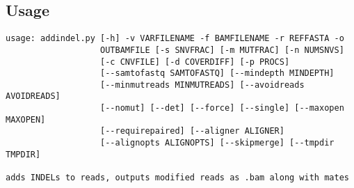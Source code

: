 \documentclass[letterpaper,11pt]{article}
\begin{document}
\subsection{Usage}
\begin{verbatim}
usage: addindel.py [-h] -v VARFILENAME -f BAMFILENAME -r REFFASTA -o
                   OUTBAMFILE [-s SNVFRAC] [-m MUTFRAC] [-n NUMSNVS]
                   [-c CNVFILE] [-d COVERDIFF] [-p PROCS]
                   [--samtofastq SAMTOFASTQ] [--mindepth MINDEPTH]
                   [--minmutreads MINMUTREADS] [--avoidreads AVOIDREADS]
                   [--nomut] [--det] [--force] [--single] [--maxopen MAXOPEN]
                   [--requirepaired] [--aligner ALIGNER]
                   [--alignopts ALIGNOPTS] [--skipmerge] [--tmpdir TMPDIR]

adds INDELs to reads, outputs modified reads as .bam along with mates


\end{verbatim}
\end{document}
